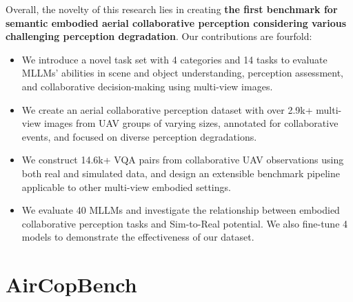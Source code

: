 \documentclass[letterpaper]{article} %
\begin{document}

Overall, the novelty of this research lies in creating \textbf{the first benchmark for semantic embodied aerial collaborative perception considering various challenging perception degradation}. Our contributions are fourfold:
\begin{itemize}[left=0pt]
    \item We introduce a novel task set with 4 categories and 14 tasks to evaluate MLLMs' abilities in scene and object understanding, perception assessment, and collaborative decision-making using multi-view images.
    \item We create an aerial collaborative perception dataset with over 2.9k+ multi-view images from UAV groups of varying sizes, annotated for collaborative events, and focused on diverse perception degradations.
    \item We construct 14.6k+ VQA pairs from collaborative UAV observations using both real and simulated data, and design an extensible benchmark pipeline applicable to other multi-view embodied settings.
    \item We evaluate 40 MLLMs and investigate the relationship between embodied collaborative perception tasks and Sim-to-Real potential. We also fine-tune 4 models to demonstrate the effectiveness of our dataset.
\end{itemize}


\section{AirCopBench}
\end{document}
